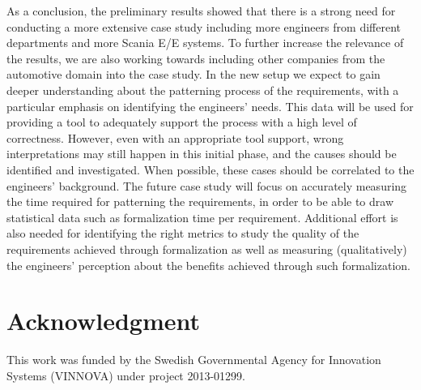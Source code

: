 \documentclass[conference]{IEEEtran}
\begin{document}
As a conclusion, the preliminary results showed that there is a strong need for conducting a more extensive case study including more engineers from different departments and more Scania E/E systems. To further increase the relevance of the results, we are also working towards including other companies from the automotive domain into the case study. In the new setup we expect to gain deeper understanding about the patterning process of the requirements, with a particular emphasis on identifying the engineers' needs. This data will be used for providing a tool to adequately support the process with a high level of correctness. However, even with an appropriate tool support, wrong interpretations may still happen in this initial phase, and the causes should be identified and investigated. When possible, these cases should be correlated to the engineers' background. 
The future case study will focus on accurately measuring the time required for patterning the requirements, in order to be able to draw statistical data such as formalization time per requirement. Additional effort is also needed for identifying the right metrics to study the quality of the requirements achieved through formalization as well as measuring (qualitatively) the engineers' perception about the benefits achieved through such formalization.

\section*{Acknowledgment}
This work was funded by the Swedish Governmental Agency for Innovation Systems (VINNOVA) under project 2013-01299.



\end{document}
